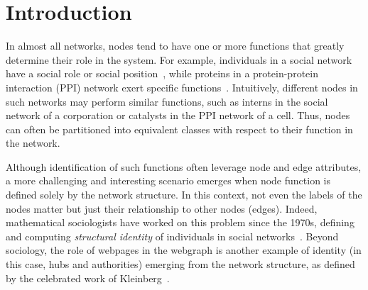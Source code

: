 \documentclass[sigconf]{acmart}
\begin{document}




\maketitle

\section{Introduction}
\label{sec:intro}

In almost all networks, nodes tend to have one or more functions that greatly determine their role in the system. For example, individuals in a social network have a social role or social position~\cite{lorrain1971structural,Sailer1978}, while proteins in a protein-protein interaction (PPI) network exert specific functions~\cite{Singh2008,Atias2012}. Intuitively, different nodes in such networks may perform similar functions, such as interns in the social network of a corporation or catalysts in the PPI network of a cell. Thus, nodes can often be partitioned into equivalent classes with respect to their function in the network. 

Although identification of such functions often leverage node and edge attributes, a more challenging and interesting scenario emerges when node function is defined solely by the network structure. In this context, not even the labels of the nodes matter but just their relationship to other nodes (edges). Indeed, mathematical sociologists have worked on this problem since the 1970s, defining and computing {\em structural identity} of individuals in social networks~\cite{lorrain1971structural,Sailer1978,Pizarro2007}. Beyond sociology, the role of webpages in the webgraph is another example of identity (in this case, hubs and authorities) emerging from the network structure, as defined by the celebrated work of Kleinberg~\cite{Kleinberg1999}. 
\end{document}
